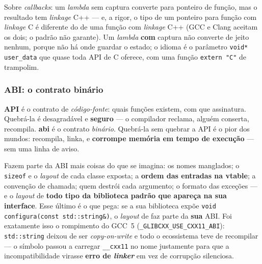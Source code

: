 Sobre \emph{callbacks}: um \emph{lambda} sem captura converte para ponteiro de
função, mas o resultado tem \emph{linkage} C++ --- e, a rigor, o tipo de um
ponteiro para função com \emph{linkage} C é diferente do de uma função com
\emph{linkage} C++ (GCC e Clang aceitam os dois; o padrão não garante). Um
\emph{lambda} \textbf{com} captura não converte de jeito nenhum, porque não há
onde guardar o estado; o idioma é o parâmetro \texttt{void* user\_data} que
quase toda API de C oferece, com uma função \texttt{extern "C"} de trampolim.

\subsubsection{ABI: o contrato binário}
\label{sec:linkage-abi}

\begin{porque}
\textbf{API} é o contrato de \emph{código-fonte}: quais funções existem, com que
assinatura. Quebrá-la é desagradável e \textbf{seguro} --- o compilador reclama,
alguém conserta, recompila. \textbf{\Gls{abi}} é o contrato \emph{binário}.
Quebrá-la sem quebrar a API é o pior dos mundos: recompila, linka, e
\textbf{corrompe memória em tempo de execução} --- sem uma linha de aviso.
\end{porque}

Fazem parte da ABI mais coisas do que se imagina: os nomes manglados; o
\texttt{sizeof} e o \emph{layout} de cada classe exposta; a \textbf{ordem das
entradas na vtable}; a convenção de chamada; quem destrói cada argumento; o
formato das exceções --- e o \emph{layout} de \textbf{todo tipo da biblioteca
padrão que apareça na sua interface}. Esse último é o que pega: se a sua
biblioteca expõe \texttt{void configura(const std::string\&)}, o \emph{layout} de
 faz parte da \textbf{sua} ABI. Foi exatamente isso o
rompimento do GCC~5 (\texttt{\_GLIBCXX\_USE\_CXX11\_ABI}): \texttt{std::string}
deixou de ser \emph{copy-on-write} e todo o ecossistema teve de recompilar --- o
símbolo passou a carregar \texttt{\_\_cxx11} no nome justamente para que a
incompatibilidade virasse \textbf{erro de \emph{linker}} em vez de corrupção
silenciosa.

